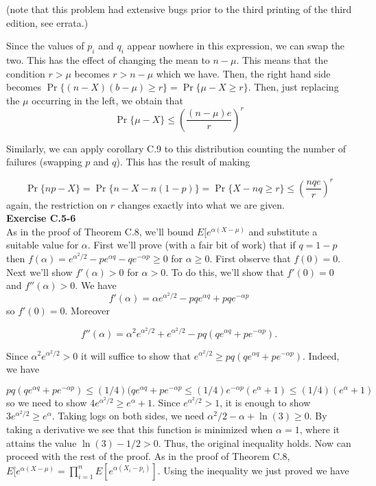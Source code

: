 \documentclass{article}
\begin{document}
(note that this problem had extensive bugs prior to the third printing of the third edition, see errata.)

Since the values of $p_i$ and $q_i$ appear nowhere in this expression, we can swap the two. This has the effect of changing the mean to $n-\mu$. This means that the condition $r>\mu$ becomes $r > n-\mu$ which we have. Then, the right hand side becomes $\Pr\{(n-X) (b-\mu)\ge r\} = \Pr\{\mu-X \ge r\}$. Then, just replacing the $\mu$ occurring in the left, we obtain that
\[
\Pr\{\mu- X\} \le \left(\frac{(n-\mu)e}{r}\right)^r
\]

Similarly, we can apply corollary C.9 to this distribution counting the number of failures (swapping $p$ and $q$). This has the result of making

\[
\Pr\{ np -X\} =  \Pr\{ n - X - n(1-p)\} = \Pr\{X - nq\ge r\}   \le \left(\frac{nqe}{r}\right)^r
\]
again, the restriction on $r$ changes exactly into what we are given.\\

\noindent\textbf{Exercise C.5-6}\\

As in the proof of Theorem C.8, we'll bound $E[e^{\alpha(X-\mu)}$ and substitute a suitable value for $\alpha$.  First we'll prove (with a fair bit of work) that if $q = 1-p$ then $f(\alpha) = e^{\alpha^2/2} - pe^{\alpha q} - qe^{-\alpha p} \geq 0$ for $\alpha \geq 0$.  First observe that $f(0) = 0$.  Next we'll show $f'(\alpha) > 0$ for $\alpha > 0$.  To do this, we'll show that $f'(0) = 0$ and $f''(\alpha) > 0$.  We have
\[f'(\alpha) = \alpha e^{\alpha^2/2} - pqe^{\alpha q} + pqe^{-\alpha p} \]
so $f'(0) = 0$.  Moreover

\[ f''(\alpha) = \alpha^2e^{\alpha^2/2} + e^{\alpha^2/2} - pq(qe^{\alpha q} + pe^{-\alpha p}).\]

Since $ \alpha^2e^{\alpha^2/2} > 0$ it will suffice to show that $e^{\alpha^2/2} \geq pq(qe^{\alpha q} + pe^{-\alpha p})$.  Indeed, we have

\[pq(qe^{\alpha q} + pe^{-\alpha p}) \leq (1/4)(qe^{\alpha q} + pe^{-\alpha p} \leq (1/4)e^{-\alpha p}(e^\alpha + 1) \leq (1/4)(e^\alpha + 1)\]
so we need to show $4e^{\alpha^2/2} \geq e^{\alpha} + 1$.  Since $e^{\alpha^2/2} > 1$, it is enough to show $3e^{\alpha^2/2} \geq e^{\alpha}$.  Taking logs on both sides, we need $\alpha^2/2 - \alpha + \ln(3) \geq 0$.  By taking a derivative we see that this function is minimized when $\alpha = 1$, where it attains the value $\ln(3)-1/2 > 0$.  Thus, the original inequality holds.  Now can proceed with the rest of the proof.  As in the proof of Theorem C.8, $E[e^{\alpha(X-\mu)} = \prod_{i=1}^n E[e^{\alpha(X_i-p_i)}]$.  Using the inequality we just proved we have 
\end{document}
